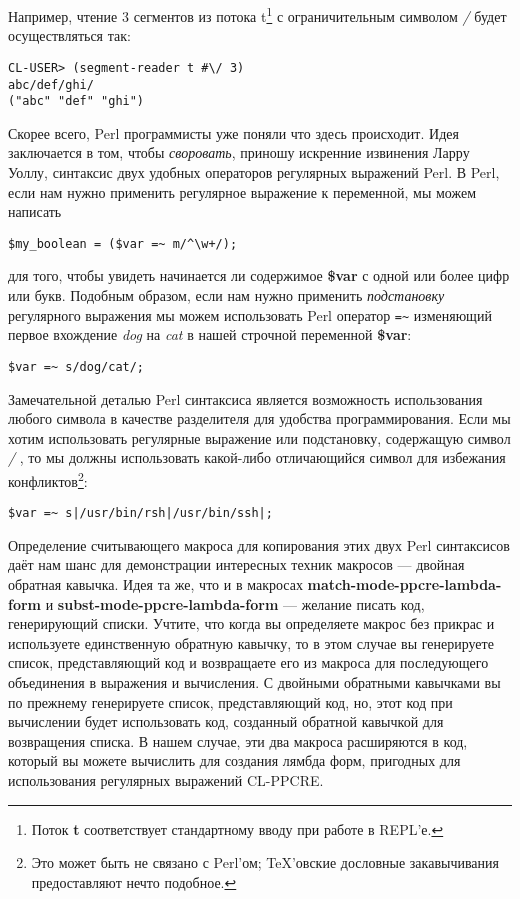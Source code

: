 Например, чтение 3 сегментов из потока t\footnote{Поток \textbf{t} соответствует стандартному вводу при работе в REPL'е.} с ограничительным символом \emph{/} будет осуществляться так:

\begin{verbatim}
CL-USER> (segment-reader t #\/ 3)
abc/def/ghi/
("abc" "def" "ghi")
\end{verbatim}

Скорее всего, Perl программисты уже поняли что здесь происходит. Идея заключается в том, чтобы \emph{своровать}, приношу искренние извинения Ларру Уоллу, синтаксис двух удобных операторов регулярных выражений Perl. В Perl, если нам нужно применить регулярное выражение к переменной, мы можем написать

\begin{verbatim}
$my_boolean = ($var =~ m/^\w+/);
\end{verbatim}

для того, чтобы увидеть начинается ли содержимое \textbf{\$var} с одной или более цифр или букв. Подобным образом, если нам нужно применить \emph{подстановку} регулярного выражения мы можем использовать Perl оператор \verb"=~" изменяющий первое вхождение \emph{dog} на \emph{cat} в нашей строчной переменной \textbf{\$var}:

\begin{verbatim}
$var =~ s/dog/cat/;
\end{verbatim}

Замечательной деталью Perl синтаксиса является возможность использования любого символа в качестве разделителя для удобства программирования. Если мы хотим использовать регулярные выражение или подстановку, содержащую символ \emph{/} , то мы должны использовать какой-либо отличающийся символ для избежания конфликтов\footnote{Это может быть не связано с Perl'ом; \TeX'овские дословные закавычивания предоставляют нечто подобное.}:

\begin{verbatim}
$var =~ s|/usr/bin/rsh|/usr/bin/ssh|;
\end{verbatim}

Определение считывающего макроса для копирования этих двух Perl синтаксисов даёт нам шанс для демонстрации интересных техник макросов --- двойная обратная кавычка. Идея та же, что и в макросах \textbf{match-mode-ppcre-lambda-form} и \textbf{subst-mode-ppcre-lambda-form} --- желание писать код, генерирующий списки. Учтите, что когда вы определяете макрос без прикрас и используете единственную обратную кавычку, то в этом случае вы генерируете список, представляющий код и возвращаете его из макроса для последующего объединения в выражения и вычисления. С двойными обратными кавычками вы по прежнему генерируете список, представляющий код, но, этот код при вычислении будет использовать код, созданный обратной кавычкой для возвращения списка. В нашем случае, эти два макроса расширяются в код, который вы можете вычислить для создания лямбда форм, пригодных для использования регулярных выражений CL-PPCRE.

